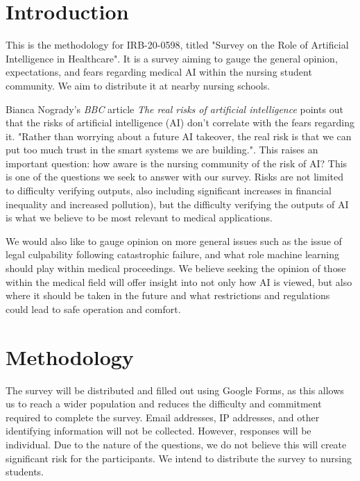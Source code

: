 \documentclass[]{article}
\begin{document}
	
    \section{Introduction}

    This is the methodology for IRB-20-0598, titled "Survey on the Role of Artificial Intelligence in Healthcare". It is a survey aiming to gauge the general opinion, expectations, and fears regarding medical AI within the nursing student community. We aim to distribute it at nearby nursing schools.

    Bianca Nogrady's \emph{BBC} article \emph{The real risks of artificial intelligence} points out that the risks of artificial intelligence (AI) don't correlate with the fears regarding it. "Rather than worrying about a future AI takeover, the real risk is that we can put too much trust in the smart systems we are building."\cite{bbc2016rroai}. This raises an important question: how aware is the nursing community of the risk of AI? This is one of the questions we seek to answer with our survey. Risks are not limited to difficulty verifying outputs, also including significant increases in financial inequality and increased pollution)\cite{emerj2019roawrtiwwa}, but the difficulty verifying the outputs of AI is what we believe to be most relevant to medical applications.

    We would also like to gauge opinion on more general issues such as the issue of legal culpability following catastrophic failure, and what role machine learning should play within medical proceedings. We believe seeking the opinion of those within the medical field will offer insight into not only how AI is viewed, but also where it should be taken in the future and what restrictions and regulations could lead to safe operation and comfort.
    
    \section{Methodology}

    The survey will be distributed and filled out using Google Forms, as this allows us to reach a wider population and reduces the difficulty and commitment required to complete the survey. Email addresses, IP addresses, and other identifying information will not be collected. However, responses will be individual. Due to the nature of the questions, we do not believe this will create significant risk for the participants. We intend to distribute the survey to nursing students.
\end{document}
